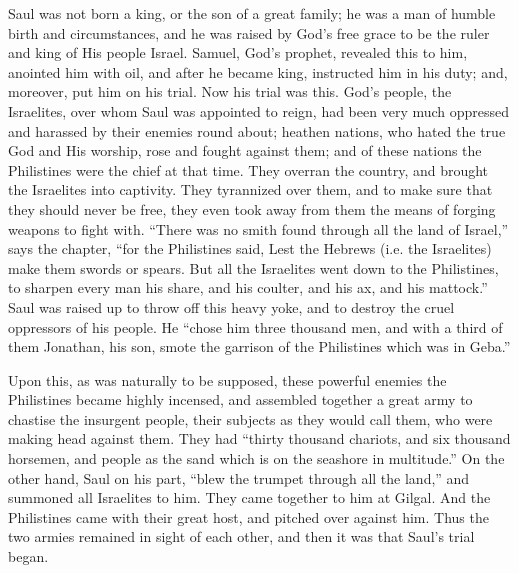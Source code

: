 Saul was not born a king, or the son of a great family; he was a
man of humble birth and circumstances, and he was raised by God's free
grace to be the ruler and king of His people Israel. Samuel, God's
prophet, revealed this to him, anointed him with oil, and after he
became king, instructed him in his duty; and, moreover, put him on his
trial. Now his trial was this. God's people, the Israelites, over whom
Saul was appointed to reign, had been very much oppressed and harassed
by their enemies round about; heathen nations, who hated the true God
and His worship, rose and fought against them; and of these nations
the Philistines were the chief at that time. They overran the country,
and brought the Israelites into captivity. They tyrannized over them,
and to make sure that they should never be free, they even took away
from them the means of forging weapons to fight with. ``There was
no smith found through all the land of Israel,'' says the chapter,
``for the Philistines said, Lest the Hebrews (i.e. the Israelites)
make them swords or spears. But all the Israelites went down to the
Philistines, to sharpen every man his share, and his coulter, and his
ax, and his mattock.'' Saul was raised up to throw off this heavy
yoke, and to destroy the cruel oppressors of his people. He
``chose him three thousand men, and with a third of them Jonathan,
his son, smote the garrison of the Philistines which was in Geba.''

Upon this, as was naturally to be supposed, these powerful enemies
the Philistines became highly incensed, and assembled together a great
army to chastise the insurgent people, their subjects as they would
call them, who were making head against them. They had ``thirty
thousand chariots, and six thousand horsemen, and people as the sand
which is on the seashore in multitude.'' On the other hand, Saul
on his part, ``blew the trumpet through all the land,'' and
summoned all Israelites to him. They came together to him at Gilgal.
And the Philistines came with their great host, and pitched over
against him. Thus the two armies remained in sight of each other, and
then it was that Saul's trial began.

